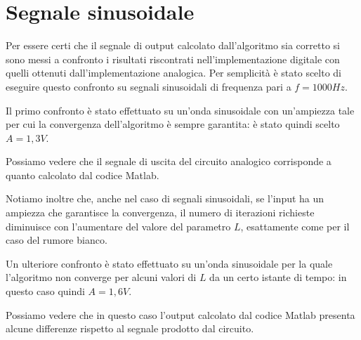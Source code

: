 		\pagebreak
	
	\section{Segnale sinusoidale}
		Per essere certi che il segnale di output calcolato dall'algoritmo sia corretto si sono messi a confronto i risultati riscontrati nell'implementazione digitale con quelli ottenuti dall'implementazione analogica. Per semplicità è stato scelto di eseguire questo confronto su segnali sinusoidali di frequenza pari a $f = 1000Hz$.
	
		Il primo confronto è stato effettuato su un'onda sinusoidale con un'ampiezza tale per cui la convergenza dell'algoritmo è sempre garantita: è stato quindi scelto $A = 1,3V$.
	
		\pagebreak
	
		Possiamo vedere che il segnale di uscita del circuito analogico corrisponde a quanto calcolato dal codice Matlab.
	
			
		Notiamo inoltre che, anche nel caso di segnali sinusoidali, se l'input ha un ampiezza che garantisce la convergenza, il numero di iterazioni richieste diminuisce con l'aumentare del valore del parametro $L$, esattamente come per il caso del rumore bianco.
	
		\pagebreak
	
		Un ulteriore confronto è stato effettuato su un'onda sinusoidale per la quale l'algoritmo non converge per alcuni valori di $L$ da un certo istante di tempo: in questo caso quindi $A = 1,6V$.
	
			
		Possiamo vedere che in questo caso l'output calcolato dal codice Matlab presenta alcune differenze rispetto al segnale prodotto dal circuito.
	
		\pagebreak
		
